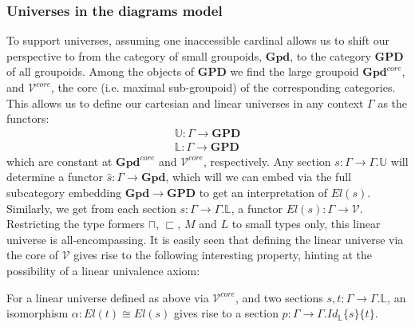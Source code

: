 \documentclass[a4paper,english]{lipics-v2018}
\begin{document}
\subsubsection{Universes in the diagrams model}
To support universes, assuming one inaccessible cardinal allows us to shift our perspective to from the category of small groupoids, $\mathbf{Gpd}$, to the category $\mathbf{GPD}$ of all groupoids. Among the objects of $\mathbf{GPD}$ we find the large groupoid $\mathbf{Gpd}^{core}$, and $\mathcal{V}^{core}$, the core (i.e. maximal sub-groupoid) of the corresponding categories. This allows us to define our cartesian and linear universes in any context $\Gamma$ as the functors:
\[
  \begin{split}
    \mathbb{U} :  \Gamma \to \mathbf{GPD}\\
    \mathbb{L} : \Gamma \to \mathbf{GPD}
  \end{split}
\]
which are constant at $\mathbf{Gpd}^{core}$ and $\mathcal{V}^{core}$, respectively. Any section $s : \Gamma \to \Gamma.\mathbb{U}$ will determine a functor $\hat s : \Gamma \to \mathbf{Gpd}$, which will we can embed via the full subcategory embedding $\mathbf{Gpd} \to \mathbf{GPD}$ to get an interpretation of $El(s)$. Similarly, we get from each section $s : \Gamma \to \Gamma.\mathbb{L}$, a functor $El(s) : \Gamma \to \mathcal{V}$. Restricting the type formers $\sqcap$, $\sqsubset$, $M$ and $L$ to small types only, this linear universe is all-encompassing.
It is easily seen that defining the linear universe via the core of $\mathcal{V}$ gives rise to the following interesting property, hinting at the possibility of a linear univalence axiom:
\begin{corollary}For a linear universe defined as above via $\mathcal{V}^{core}$, and two sections $s, t : \Gamma \to \Gamma.\mathbb{L}$, an isomorphism $\alpha : El(t) \cong El(s)$ gives rise to a section $p : \Gamma \to \Gamma.Id_{\mathbb{L}}\{s\}\{t\}$.
\end{corollary}
\end{document}
